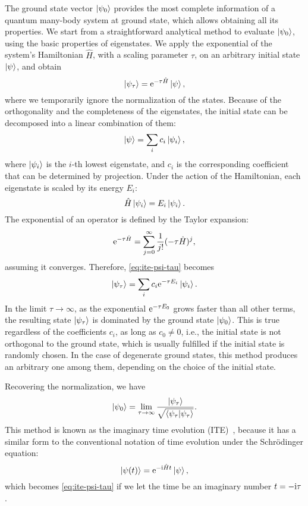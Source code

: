 The ground state vector $\ket{\psi_0}$ provides the most complete information of a quantum many-body system at ground state, which allows obtaining all its properties. We start from a straightforward analytical method to evaluate $\ket{\psi_0}$, using the basic properties of eigenstates. We apply the exponential of the system's Hamiltonian $\hat{H}$, with a scaling parameter $\tau$, on an arbitrary initial state $\ket{\psi}$, and obtain
\begin{equation}
\ket{\psi_\tau} = \mathrm{e}^{-\tau \hat{H}} \ket{\psi},
\label{eq:ite-psi-tau}
\end{equation}
where we temporarily ignore the normalization of the states. Because of the orthogonality and the completeness of the eigenstates, the initial state can be decomposed into a linear combination of them:
\begin{equation}
\ket{\psi} = \sum_i c_i \ket{\psi_i},
\end{equation}
where $\ket{\psi_i}$ is the $i$-th lowest eigenstate, and $c_i$ is the corresponding coefficient that can be determined by projection. Under the action of the Hamiltonian, each eigenstate is scaled by its energy $E_i$:
\begin{equation}
\hat{H} \ket{\psi_i} = E_i \ket{\psi_i}.
\end{equation}
The exponential of an operator is defined by the Taylor expansion:
\begin{equation}
\mathrm{e}^{-\tau \hat{H}} = \sum_{j = 0}^\infty \frac{1}{j!} (-\tau \hat{H})^j,
\label{eq:ite-taylor}
\end{equation}
assuming it converges. Therefore, \cref{eq:ite-psi-tau} becomes
\begin{equation}
\ket{\psi_\tau} = \sum_i c_i \mathrm{e}^{-\tau E_i} \ket{\psi_i}.
\end{equation}
In the limit $\tau \to \infty$, as the exponential $\mathrm{e}^{-\tau E_0}$ grows faster than all other terms, the resulting state $\ket{\psi_\tau}$ is dominated by the ground state $\ket{\psi_0}$. This is true regardless of the coefficients $c_i$, as long as $c_0 \neq 0$, i.e., the initial state is not orthogonal to the ground state, which is usually fulfilled if the initial state is randomly chosen. In the case of degenerate ground states, this method produces an arbitrary one among them, depending on the choice of the initial state.

Recovering the normalization, we have
\begin{equation}
\ket{\psi_0} = \lim_{\tau \to \infty} \frac{\ket{\psi_\tau}}{\sqrt{\ip{\psi_\tau}}}.
\label{eq:ite}
\end{equation}
This method is known as the imaginary time evolution (ITE)~\cite{goldberg1967integration}, because it has a similar form to the conventional notation of time evolution under the Schrödinger equation:
\begin{equation}
\ket{\psi(t)} = \mathrm{e}^{-\mathrm{i} \hat{H} t} \ket{\psi},
\end{equation}
which becomes \cref{eq:ite-psi-tau} if we let the time be an imaginary number $t = -\mathrm{i} \tau$.

